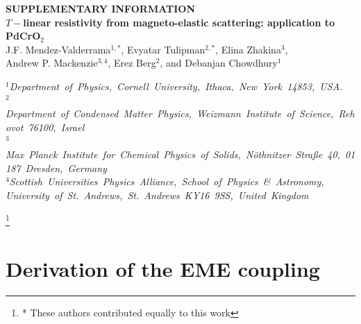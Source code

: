 \documentclass[aps,prl,twocolumn,superscriptaddress,amsmath,nofootinbib,10pt,floatfix]{revtex4-2}
\begin{document}
\clearpage
\renewcommand{\thefigure}{S\arabic{figure}}
\renewcommand{\figurename}{Supplemental Figure}
\setcounter{figure}{0}
\appendix
{}
\begin{widetext}

\begin{center}
  \textbf{\large SUPPLEMENTARY INFORMATION}\\[.2cm]
  \textbf{\large $T-$linear resistivity from magneto-elastic scattering: application to PdCrO$_2$}\\[.2cm]
  J.F. Mendez-Valderrama$^{1,*}$, Evyatar Tulipman$^{2,*}$, Elina Zhakina$^{3}$, \\ Andrew P. Mackenzie$^{3,4}$, Erez Berg$^{2}$, and Debanjan Chowdhury$^{1}$
  
  {\itshape
        \mbox{$^{1}$Department of Physics, Cornell University, Ithaca, New York 14853, USA.}\\
        \mbox{$^{2}$Department of Condensed Matter Physics, Weizmann Institute of Science, Rehovot 76100, Israel}\\
  	\mbox{$^{3}$Max Planck Institute for Chemical Physics of Solids, N\"othnitzer Stra\ss e 40, 01187 Dresden, Germany}\\
   \mbox{$^{4}$Scottish Universities Physics Alliance, School of Physics \& Astronomy, }
   \mbox{University of St. Andrews, St. Andrews KY16 9SS, United Kingdom}
	
 }
\end{center}
\let\thefootnote\relax\footnote{* These authors contributed equally to this work}


\section{Derivation of the EME coupling} \label{appendix_model}


\end{widetext}
\end{document}
